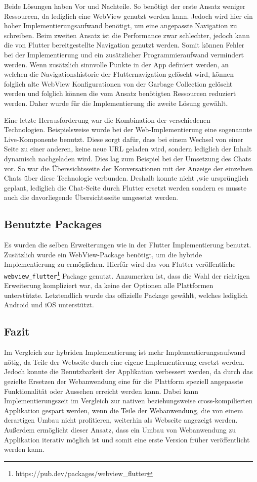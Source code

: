 Beide Lösungen haben Vor und Nachteile. So benötigt der erste Ansatz weniger Ressourcen, da lediglich eine WebView genutzt werden kann. Jedoch wird hier ein hoher Implementierungsaufwand benötigt, um eine angepasste Navigation zu schreiben. 
Beim zweiten Ansatz ist die Performance zwar schlechter, jedoch kann die von Flutter bereitgestellte Navigation genutzt werden. Somit können Fehler bei der Implementierung und ein zusätzlicher Programmieraufwand vermindert werden.
Wenn zusätzlich sinnvolle Punkte in der App definiert werden, an welchen die Navigationshistorie der Flutternavigation gelöscht wird, können folglich alte WebView Konfigurationen von der Garbage Collection gelöscht werden und folglich können die vom Ansatz benötigten Ressourcen reduziert werden. Daher wurde für die Implementierung die zweite Lösung gewählt. 

Eine letzte Herausforderung war die Kombination der verschiedenen Technologien. Beispielsweise wurde bei der Web-Implementierung eine sogenannte Live-Komponente benutzt. Diese sorgt dafür, dass bei einem Wechsel von einer Seite zu einer anderen, keine neue URL geladen wird, sondern lediglich der Inhalt dynamisch nachgeladen wird. Dies lag zum Beispiel bei der Umsetzung des Chats vor. So war die Überssichtsseite der Konversationen mit der Anzeige der einzelnen Chats über diese Technologie verbunden. Deshalb konnte nicht ,wie ursprünglich geplant, lediglich die Chat-Seite durch Flutter ersetzt werden sondern es musste auch die davorliegende Übersichtsseite umgesetzt werden.

\subsection{Benutzte Packages}
Es wurden die selben Erweiterungen wie in der Flutter Implementierung benutzt. Zusätzlich wurde ein WebView-Package benötigt, um die hybride Implementierung zu ermöglichen. Hierfür wird das von Flutter veröffentliche \verb|webview_flutter|\footnote{https://pub.dev/packages/webview\_flutter} Package genutzt. Anzumerken ist, dass die Wahl der richtigen Erweiterung kompliziert war, da keine der Optionen alle Plattformen unterstützte. Letztendlich wurde das offizielle Package gewählt, welches lediglich Android und iOS unterstützt.

\subsection{Fazit}
Im Vergleich zur hybriden Implementierung ist mehr Implementierungsaufwand nötig, da Teile der Webseite durch eine eigene Implementierung ersetzt werden. Jedoch konnte die Benutzbarkeit der Applikation verbessert werden, da durch das gezielte Ersetzen der Webanwendung eine für die Plattform speziell angepasste Funktionalität oder Aussehen erreicht werden kann. Dabei kann Implementierungszeit im Vergleich zur nativen beziehungsweise cross-kompilierten Applikation gespart werden, wenn die Teile der Webanwendung, die von einem derartigen Umbau nicht profitieren, weiterhin als Webseite angezeigt werden.
Außerdem ermöglicht dieser Ansatz, dass ein Umbau von Webanwendung zu Applikation iterativ möglich ist und somit eine erste Version früher veröffentlicht werden kann.

